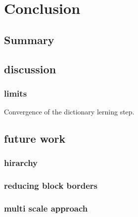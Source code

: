\chapter{Conclusion}
\section{Summary} %

\section{discussion}
\subsection{limits}
Convergence of the dictionary lerning step.

\section{future work}
\subsection{hirarchy}
\subsection{reducing block borders}
\subsection{multi scale approach}